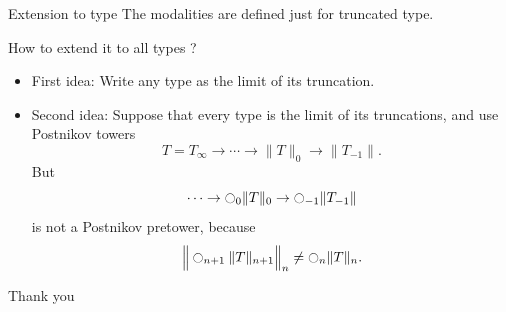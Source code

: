 \documentclass{beamer}
\newcommand{\xmark}{\ding{55}}%
\newcommand{\modal}{\ensuremath{\ocircle}}
\begin{document}
\begin{frame}{Extension to type}
  The modalities are defined just for truncated type.

  \bigskip

  How to extend it to all types ?
\end{frame}

\begin{frame}
  \begin{itemize}
  \item<1-> First idea: Write any type as the limit of its
    truncation. \onslide<2->{\textcolor{red}{\xmark}}
  \item<3-> Second idea: Suppose that every type is the limit of
    its truncations, and use Postnikov towers
    \[ T = T_\infty \to \cdots \to \|T\|_0 \to \|T_{-1}\|.\]
    But
    \[  \cdots \to \modal_0\|T\|_0 \to \modal_{-1} \|T_{-1}\|\]
    is not a Postnikov pretower, because
    \[  \Big\|\modal_{n+1} \|T\|_{n+1}\Big\|_{n} \not= \modal_n
    \|T\|_n.\]
    \onslide<4->{\textcolor{red}{\xmark}}
  \end{itemize}
\end{frame}

\begin{frame}
  \centering
  \begin{center}
  \Huge{Thank you}    
  \end{center}

\end{frame}
\end{document}
